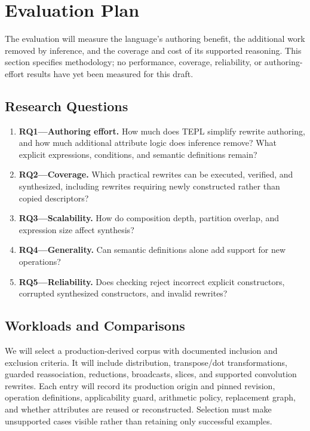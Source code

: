 \FloatBarrier
\section{Evaluation Plan}
\label{sec:evaluation}
The evaluation will measure the language's authoring benefit, the additional
work removed by inference, and the coverage and cost of its supported
reasoning. This section specifies methodology; no performance, coverage,
reliability, or authoring-effort results have yet been measured for this draft.

\FloatBarrier
\subsection{Research Questions}
\begin{enumerate}
\item \textbf{RQ1---Authoring effort.} How much does TEPL simplify rewrite
authoring, and how much additional attribute logic does inference remove?
What explicit expressions, conditions, and semantic definitions remain?
\item \textbf{RQ2---Coverage.} Which practical rewrites can be executed,
verified, and synthesized, including rewrites requiring newly constructed
rather than copied descriptors?
\item \textbf{RQ3---Scalability.} How do composition depth, partition overlap,
and expression size affect synthesis?
\item \textbf{RQ4---Generality.} Can semantic definitions alone add support
for new operations?
\item \textbf{RQ5---Reliability.} Does checking reject incorrect explicit
constructors, corrupted synthesized constructors, and invalid rewrites?
\end{enumerate}

\FloatBarrier
\subsection{Workloads and Comparisons}
We will select a production-derived corpus with documented inclusion and
exclusion criteria. It will include distribution, transpose/dot transformations,
guarded reassociation, reductions, broadcasts, slices, and supported
convolution rewrites. Each entry will record its production origin and pinned
revision, operation definitions, applicability guard, arithmetic policy,
replacement graph, and whether attributes are reused or reconstructed.
Selection must make unsupported cases visible rather than retaining only
successful examples. 

